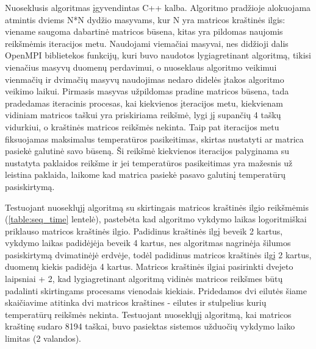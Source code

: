 \documentclass{VUMIFPSbakalaurinis}
\begin{document}
Nuoseklusis algoritmas įgyvendintas C++ kalba. 
Algoritmo pradžioje alokuojama atmintis dviems N*N dydžio masyvams, kur N yra matricos kraštinės ilgis: viename saugoma dabartinė matricos būsena, kitas yra pildomas naujomis reikšmėmis iteracijos metu.
Naudojami viemačiai masyvai, nes didžioji dalis OpenMPI biblietekos funkcijų, kuri buvo naudotos lygiagretinant algoritmą, tikisi vienačius masyvų duomenų perdavimui, o nuoseklaus algoritmo veikimui vienmačių ir dvimačių masyvų naudojimas nedaro didelės įtakos algoritmo veikimo laikui.
Pirmasis masyvas užpildomas pradine matricos būsena, tada pradedamas iteracinis procesas, kai kiekvienos įteracijos metu, kiekvienam vidiniam matricos taškui yra priskiriama reikšmė, lygi jį supančių 4 taškų vidurkiui, o kraštinės matricos reikšmės nekinta.
Taip pat iteracijos metu fiksuojamas maksimalus temperatūros pasikeitimas, skirtas nustatyti ar matrica pasiekė galutinė savo būseną.
Ši reikšmė kiekvienos iteracijos palyginama su nustatyta paklaidos reikšme ir jei temperatūros pasikeitimas yra mažesnis už leistina paklaida, laikome kad matrica pasiekė pasavo galutinį temperatūrų pasiskirtymą.

Testuojant nuoseklųjį algoritmą su skirtingais matricos kraštinės ilgio reikšmėmis (\ref{table:seq_time} lentelė), pastebėta kad algoritmo vykdymo laikas logoritmiškai priklauso matricos kraštinės ilgio.
Padidinus kraštinės ilgį beveik 2 kartus, vykdymo laikas padidėjėja beveik 4 kartus, nes algoritmas nagrinėja šilumos pasiskirtymą dvimatinėjė erdvėje, todėl padidinus matricos kraštinės ilgį 2 kartus, duomenų kiekis padidėja 4 kartus.
Matricos kraštinės ilgiai pasirinkti dvejeto laipsniai + 2, kad lygiagretinant algoritmą vidinės matricos reikšmes būtų padalinti skirtingams procesams vienodais kiekiais. 
Pridedamos dvi eilutės šiame skaičiavime atitinka dvi matricos kraštines - eilutes ir stulpelius kurių temperatūrų reikšmės nekinta.
Testuojant nuoseklųjį algoritmą, kai matricos kraštinę sudaro 8194 taškai, buvo pasiektas sistemos užduočių vykdymo laiko limitas (2 valandos).
\end{document}
